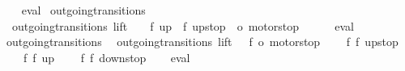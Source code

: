 \begin{isabellebody}
\ \ %
\endisadelimproof
%
\isatagproof
{}\isamarkupfalse%
\ eval%
\endisatagproof
{\isafoldproof}%
%
\isadelimproof
\isanewline
%
\endisadelimproof
\isanewline
{}\isamarkupfalse%
\ outgoing{\isacharunderscore}transitions{\isacharunderscore}{}{\isacharcolon}\isanewline
\ \ {\isachardoublequoteopen}outgoing{\isacharunderscore}transitions\ lift\ {}\ {\isacharequal}\ {\isacharbraceleft}{\isacharbar}{\isacharparenleft}{\isacharparenleft}{}{\isacharcomma}\ f{}{\isacharparenright}{\isacharcomma}\ up{}{}{\isacharparenright}{\isacharcomma}\ {\isacharparenleft}{\isacharparenleft}{}{\isacharcomma}\ f{}{\isacharparenright}{\isacharcomma}\ up{}{}stop{\isacharparenright}{\isacharcomma}\ {\isacharparenleft}{\isacharparenleft}{}{\isacharcomma}\ o{}{\isacharparenright}{\isacharcomma}\ motorstop\ {}{\isacharparenright}\ {\isacharbar}{\isacharbraceright}{\isachardoublequoteclose}\isanewline
%
\isadelimproof
\ \ %
\endisadelimproof
%
\isatagproof
{}\isamarkupfalse%
\ eval%
\endisatagproof
{\isafoldproof}%
%
\isadelimproof
\isanewline
%
\endisadelimproof
\isanewline
{}\isamarkupfalse%
\ outgoing{\isacharunderscore}transitions{\isacharunderscore}{}{\isacharcolon}\isanewline
\ \ {\isachardoublequoteopen}outgoing{\isacharunderscore}transitions\ lift\ {}\ {\isacharequal}\ {\isacharbraceleft}{\isacharbar}{\isacharparenleft}{\isacharparenleft}f{}{\isacharcomma}\ o{}{\isacharparenright}{\isacharcomma}\ motorstop{}{\isacharparenright}{\isacharcomma}\isanewline
\ \ \ \ {\isacharparenleft}{\isacharparenleft}f{}{\isacharcomma}\ f{}{\isacharparenright}{\isacharcomma}\ up{}{}stop{\isacharparenright}{\isacharcomma}\isanewline
\ \ \ \ {\isacharparenleft}{\isacharparenleft}f{}{\isacharcomma}\ f{}{\isacharparenright}{\isacharcomma}\ up{}{}{\isacharparenright}{\isacharcomma}\isanewline
\ \ \ \ {\isacharparenleft}{\isacharparenleft}f{}{\isacharcomma}\ f{}{\isacharparenright}{\isacharcomma}\ down{}{}stop{\isacharparenright}{\isacharbar}{\isacharbraceright}{\isachardoublequoteclose}\isanewline
%
\isadelimproof
\ \ %
\endisadelimproof
%
\isatagproof
{}\isamarkupfalse%
\ eval%
\endisatagproof
{\isafoldproof}%
%
\isadelimproof
\isanewline
%
\endisadelimproof
\isanewline
{}\isamarkupfalse%

\end{isabellebody}
